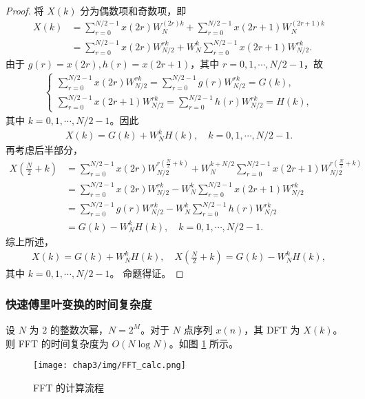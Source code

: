 \begin{proof}
    将 $X(k)$ 分为偶数项和奇数项，即
    \begin{align*}
        X(k) & = \sum_{r = 0}^{N/2 - 1}x(2r)W_N^{(2r)k}
            + \sum_{r = 0}^{N/2 - 1}x(2r + 1)W_N^{(2r + 1)k} \\
        & = \sum_{r = 0}^{N/2 - 1}x(2r)W_{N/2}^{rk}
            + W_N^k\sum_{r = 0}^{N/2 - 1}x(2r + 1)W_{N/2}^{rk}.
    \end{align*}
    由于 $g(r) = x(2r), h(r) = x(2r + 1)$，其中 $r = 0, 1, \cdots, N/2 - 1$，故
    \begin{align*}
        \begin{cases}
            \sum_{r = 0}^{N/2 - 1}x(2r)W_{N/2}^{rk}
                = \sum_{r = 0}^{N/2 - 1}g(r)W_{N/2}^{rk} = G(k), \\
            \sum_{r = 0}^{N/2 - 1}x(2r + 1)W_{N/2}^{rk}
                = \sum_{r = 0}^{N/2 - 1}h(r)W_{N/2}^{rk} = H(k),
        \end{cases}
    \end{align*}
    其中 $k = 0, 1, \cdots, N/2 - 1$。因此
    \begin{align*}
        X(k) = G(k) + W_N^kH(k), \quad k = 0, 1, \cdots, N/2 - 1.
    \end{align*}
    再考虑后半部分，
    \begin{align*}
        X\left(\frac{N}{2} + k\right) & = \sum_{r = 0}^{N/2 - 1}x(2r)W_{N/2}^{r\left(\frac{N}{2} + k\right)}
            + W_N^{k + N/2}\sum_{r = 0}^{N/2 - 1}x(2r + 1)W_{N/2}^{r\left(\frac{N}{2} + k\right)} \\
        & = \sum_{r = 0}^{N/2 - 1}x(2r)W_{N/2}^{rk}
            - W_N^k\sum_{r = 0}^{N/2 - 1}x(2r + 1)W_{N/2}^{rk} \\
        & = \sum_{r = 0}^{N/2 - 1}g(r)W_{N/2}^{rk}
            - W_N^k\sum_{r = 0}^{N/2 - 1}h(r)W_{N/2}^{rk} \\
        & = G(k) - W_N^kH(k), \quad k = 0, 1, \cdots, N/2 - 1.
    \end{align*}
    综上所述，
    \begin{align*}
        X(k) = G(k) + W_N^kH(k), \quad X\left(\frac{N}{2} + k\right) = G(k) - W_N^kH(k),
    \end{align*}
    其中 $k = 0, 1, \cdots, N/2 - 1$。
    命题得证。
\end{proof}

\subsubsection{快速傅里叶变换的时间复杂度}

\begin{theorem}
    设 $N$ 为 $2$ 的整数次幂，$N = 2^M$。对于 $N$ 点序列 $x(n)$，其 DFT 为 $X(k)$。
    则 FFT 的时间复杂度为 $O(N\log N)$。如图 \ref{fig:FFT-calc} 所示。
    \begin{figure}[H]
        \centering
        \texttt{[image: chap3/img/FFT\_calc.png]}
        \caption{FFT 的计算流程}
        \label{fig:FFT-calc}
    \end{figure}
\end{theorem}
